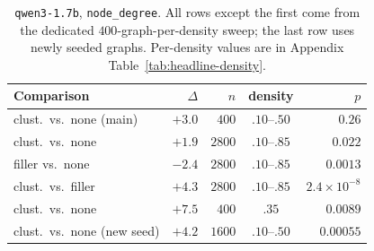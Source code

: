 \documentclass[11pt]{article}
\begin{document}
\begin{table}[H]
\centering
\footnotesize
\setlength{\tabcolsep}{2.5pt}
\caption{Route $\times$ baseline relation, main sweep plus high-density
extension (held-out: published split and probe). ``Both'' counts each cell
once per fold direction; $k$ for the window rows counts points. Interaction
CIs resample (arm, task, density) blocks, or (arm, task) for held-out
arms.}
\label{tab:robust}
\end{table}

\begin{table}[H]
\centering
\footnotesize
\setlength{\tabcolsep}{2pt}
\begin{tabular}{lrrcr}
\toprule
Comparison & $\Delta$ & $n$ & density & $p$ \\
\midrule
clust.\ vs.\ none (main)    & $+3.0$ & $400$  & $.10$--$.50$ & $0.26$ \\
clust.\ vs.\ none                & $+1.9$ & $2800$ & $.10$--$.85$ & $0.022$ \\
filler vs.\ none                 & $-2.4$ & $2800$ & $.10$--$.85$ & $0.0013$ \\
clust.\ vs.\ filler              & $+4.3$ & $2800$ & $.10$--$.85$ & $2.4{\times}10^{-8}$ \\
clust.\ vs.\ none                & $+7.5$ & $400$  & $.35$ & $0.0089$ \\
clust.\ vs.\ none (new seed) & $+4.2$ & $1600$ & $.10$--$.50$ & $0.00055$ \\
\bottomrule
\end{tabular}
\caption{\texttt{qwen3-1.7b}, \texttt{node\_degree}. All rows except the
first come from the dedicated $400$-graph-per-density sweep; the last row
uses newly seeded graphs. Per-density values are in Appendix
Table~\ref{tab:headline-density}.}
\label{tab:headline}
\end{table}
\end{document}

